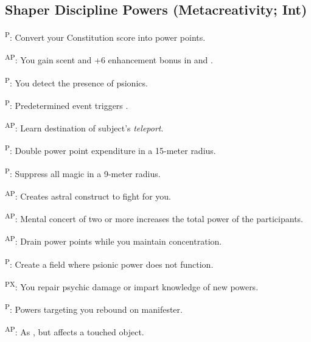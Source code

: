 \subsection{Shaper Discipline Powers {\normalsize(Metacreativity; Int)}}
\begin{enumerate*}
\item {}\textsuperscript{P}: Convert your Constitution score into power points.

      \textsuperscript{AP}: You gain scent and +6 enhancement bonus in  and .

\item {}\textsuperscript{P}: You detect the presence of psionics.

      \textsuperscript{P}: Predetermined event triggers .

\item {}\textsuperscript{AP}: Learn destination of subject's \emph{teleport}.

\item {}\textsuperscript{P}: Double power point expenditure in a 15-meter radius.

\item {}\textsuperscript{P}: Suppress all magic in a 9-meter radius.

      \textsuperscript{AP}: Creates astral construct to fight for you. %

      \textsuperscript{AP}: Mental concert of two or more increases the total power of the participants.

      \textsuperscript{AP}: Drain power points while you maintain concentration.

\item {}\textsuperscript{P}: Create a field where psionic power does not function. %

\item {}\textsuperscript{PX}: You repair psychic damage or impart knowledge of new powers. %

      \textsuperscript{P}: Powers targeting you rebound on manifester. %

      \textsuperscript{AP}: As , but affects a touched object.


\end{enumerate*}

